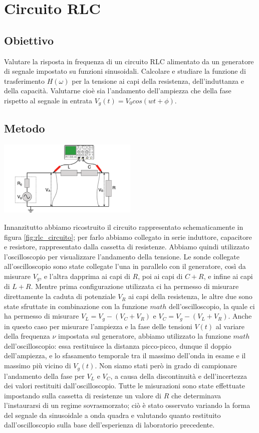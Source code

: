 \documentclass[a4paper]{article}
\begin{document}
\section{Circuito RLC}
\subsection{Obiettivo}
Valutare la risposta in frequenza di un circuito RLC alimentato da un generatore di segnale impostato su funzioni sinusoidali. Calcolare e studiare la funzione di trasferimento $H(\omega)$ per la tensione ai capi della resistenza, dell'induttanza e della capacità. Valutarne cioè sia l’andamento dell’ampiezza che della fase rispetto al segnale in entrata $V_g(t)=V_{0}  cos(wt +\phi)$.

\subsection{Metodo}
\begin{center}
	\includegraphics[width=0.5\textwidth]{grafici/circuito-rlc.png}
	\label{fig:rlc_circuito} 
\end{center}
Innanzitutto abbiamo ricostruito il circuito rappresentato schematicamente in figura \ref{fig:rlc_circuito}; per farlo abbiamo collegato in serie induttore, capacitore e resistore, rappresentato dalla cassetta di resistenze. Abbiamo quindi utilizzato l'oscilloscopio per visualizzare l'andamento della tensione. Le sonde collegate all'oscilloscopio sono state collegate l'una in parallelo con il generatore, così da misurare $V_g$, e l'altra dapprima ai capi di $R$, poi ai capi di $C + R$, e infine ai capi di $L + R$. Mentre prima configurazione utilizzata ci ha permesso di misurare direttamente la caduta di potenziale $V_R$ ai capi della resistenza, le altre due sono state sfruttate in combinazione con la funzione $math$ dell'oscilloscopio, la quale ci ha permesso di misurare $V_L = V_g - (V_C + V_R)$ e $V_C = V_g - (V_L + V_R) $. Anche in questo caso per misurare l'ampiezza e la fase delle tensioni $V(t)$ al variare della frequenza $\nu$ impostata sul generatore, abbiamo utilizzato la funzione $math$ dell'oscilloscopio: essa restituisce la distanza picco-picco, dunque il doppio dell'ampiezza, e lo sfasamento temporale tra il massimo dell'onda in esame e il massimo più vicino di $V_g(t)$. Non siamo stati però in grado di campionare l'andamento della fase per $V_L$ e $V_C$, a causa della discontinuità e dell'incertezza dei valori restituiti dall'oscilloscopio. 
Tutte le misurazioni sono state effettuate impostando sulla cassetta di resistenze un valore di $R$ che determinava l'instaurarsi di un regime sovrasmorzato; ciò è stato osservato variando la forma del segnale da sinusoidale a onda quadra e valutando quanto restituito dall'oscilloscopio sulla base dell'esperienza di laboratorio precedente.
\end{document}
